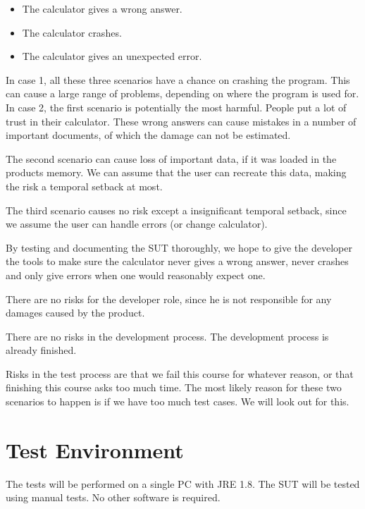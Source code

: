 \documentclass[11pt,a4paper]{article}
\begin{document}
\begin{itemize}
	\item The calculator gives a wrong answer.%
	\item The calculator crashes.
	\item The calculator gives an unexpected error.  %
\end{itemize}
In case 1, all these three scenarios have a chance on crashing the program. This can cause a large range of problems, depending on where the program is used for.
In case 2, the first scenario is potentially the most harmful. People put a lot of trust in their calculator. These wrong answers can cause mistakes in a number of important documents, of which the damage can not be estimated.

The second scenario can cause loss of important data, if it was loaded in the products memory. We can assume that the user can recreate this data, making the risk a temporal setback at most.

The third scenario causes no risk except a insignificant temporal setback, since we assume the user can handle errors (or change calculator).

By testing and documenting the SUT thoroughly, we hope to give the developer the tools to make sure the calculator never gives a wrong answer, never crashes and only give errors when one would reasonably expect one.

There are no risks for the developer role, since he is not responsible for any damages caused by the product.

There are no risks in the development process. The development process is already finished.

Risks in the test process are that we fail this course for whatever reason, or that finishing this course asks too much time. The most likely reason for these two scenarios to happen is if we have too much test cases. We will look out for this.

\section{Test Environment}
The tests will be performed on a single PC with JRE 1.8. The SUT will be tested using manual tests. No other software is required.
\end{document}
